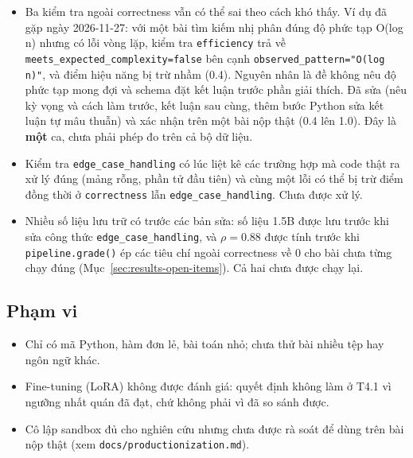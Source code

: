\documentclass[a4paper,12pt]{report}
\begin{document}
\begin{itemize}
  \item Ba kiểm tra ngoài correctness vẫn có thể sai theo cách khó thấy. Ví
    dụ đã gặp ngày 2026-11-27: với một bài tìm kiếm nhị phân đúng độ phức tạp
    O(log n) nhưng có lỗi vòng lặp, kiểm tra \texttt{efficiency} trả về
    \texttt{meets\_expected\_complexity=false} bên cạnh
    \texttt{observed\_pattern="O(log n)"}, và điểm hiệu năng bị trừ nhầm
    (0.4). Nguyên nhân là đề không nêu độ phức tạp mong đợi và schema đặt kết
    luận trước phần giải thích. Đã sửa (nêu kỳ vọng và cách làm trước, kết
    luận sau cùng, thêm bước Python sửa kết luận tự mâu thuẫn) và xác nhận
    trên một bài nộp thật (0.4 lên 1.0). Đây là \textbf{một} ca, chưa phải
    phép đo trên cả bộ dữ liệu.
  \item Kiểm tra \texttt{edge\_case\_handling} có lúc liệt kê các trường hợp mà
    code thật ra xử lý đúng (mảng rỗng, phần tử đầu tiên) và cùng một lỗi có
    thể bị trừ điểm đồng thời ở \texttt{correctness} lẫn
    \texttt{edge\_case\_handling}. Chưa được xử lý.
  \item Nhiều số liệu lưu trữ có trước các bản sửa: số liệu 1.5B được lưu
    trước khi sửa công thức \texttt{edge\_case\_handling}, và $\rho=0.88$
    được tính trước khi \texttt{pipeline.grade()} ép các tiêu chí ngoài
    correctness về 0 cho bài chưa từng chạy đúng
    (Mục~\ref{sec:results-open-items}). Cả hai chưa được chạy lại.
\end{itemize}

\subsection{Phạm vi}

\begin{itemize}
  \item Chỉ có mã Python, hàm đơn lẻ, bài toán nhỏ; chưa thử bài nhiều tệp
    hay ngôn ngữ khác.
  \item Fine-tuning (LoRA) không được đánh giá: quyết định không làm ở T4.1
    vì ngưỡng nhất quán đã đạt, chứ không phải vì đã so sánh được.
  \item Cô lập sandbox đủ cho nghiên cứu nhưng chưa được rà soát để dùng
    trên bài nộp thật (xem \texttt{docs/productionization.md}).
\end{itemize}
\end{document}
